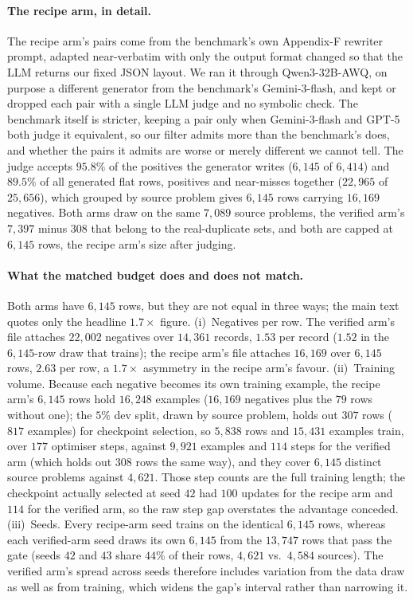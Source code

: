 \paragraph{The recipe arm, in detail.}
The recipe arm's pairs come from the benchmark's own Appendix-F rewriter prompt, adapted near-verbatim with only the output format changed so that the LLM returns our fixed JSON layout. We ran it through Qwen3-32B-AWQ, on purpose a different generator from the benchmark's Gemini-3-flash, and kept or dropped each pair with a single LLM judge and no symbolic check. The benchmark itself is stricter, keeping a pair only when Gemini-3-flash and GPT-5 both judge it equivalent, so our filter admits more than the benchmark's does, and whether the pairs it admits are worse or merely different we cannot tell. The judge accepts $95.8\%$ of the positives the generator writes ($6{,}145$ of $6{,}414$) and $89.5\%$ of all generated flat rows, positives and near-misses together ($22{,}965$ of $25{,}656$), which grouped by source problem gives $6{,}145$ rows carrying $16{,}169$ negatives. Both arms draw on the same $7{,}089$ source problems, the verified arm's $7{,}397$ minus $308$ that belong to the real-duplicate sets, and both are capped at $6{,}145$ rows, the recipe arm's size after judging.

\paragraph{What the matched budget does and does not match.}
Both arms have $6{,}145$ rows, but they are not equal in three ways; the main text quotes only the headline $1.7\times$ figure. (i)~Negatives per row. The verified arm's file attaches $22{,}002$ negatives over $14{,}361$ records, $1.53$ per record ($1.52$ in the $6{,}145$-row draw that trains); the recipe arm's file attaches $16{,}169$ over $6{,}145$ rows, $2.63$ per row, a $1.7\times$ asymmetry in the recipe arm's favour. (ii)~Training volume. Because each negative becomes its own training example, the recipe arm's $6{,}145$ rows hold $16{,}248$ examples ($16{,}169$ negatives plus the $79$ rows without one); the $5\%$ dev split, drawn by source problem, holds out $307$ rows ($817$ examples) for checkpoint selection, so $5{,}838$ rows and $15{,}431$ examples train, over $177$ optimiser steps, against $9{,}921$ examples and $114$ steps for the verified arm (which holds out $308$ rows the same way), and they cover $6{,}145$ distinct source problems against $4{,}621$. Those step counts are the full training length; the checkpoint actually selected at seed $42$ had $100$ updates for the recipe arm and $114$ for the verified arm, so the raw step gap overstates the advantage conceded. (iii)~Seeds. Every recipe-arm seed trains on the identical $6{,}145$ rows, whereas each verified-arm seed draws its own $6{,}145$ from the $13{,}747$ rows that pass the gate (seeds $42$ and $43$ share $44\%$ of their rows, $4{,}621$ vs.\ $4{,}584$ sources). The verified arm's spread across seeds therefore includes variation from the data draw as well as from training, which widens the gap's interval rather than narrowing it.

